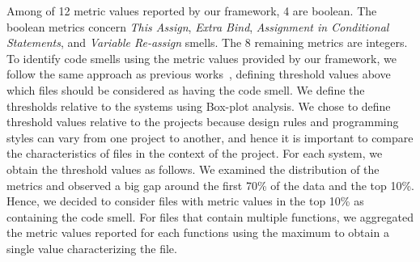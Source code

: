  Among of 12 metric values reported by our framework, 4 are boolean. The boolean metrics concern \emph{This Assign}, \emph{Extra Bind}, \emph{Assignment in Conditional Statements}, and \emph{Variable Re-assign} smells. The 8 remaining metrics are integers. To identify code smells using the metric values provided by our framework, we follow the same approach as previous works~\cite{marinescu2004detection, mazinanian2016migrating}, defining threshold values above which files should be considered as having the code smell. We define the thresholds relative to the systems using Box-plot analysis. We chose to define threshold values relative to the projects because design rules and programming styles can vary from one project to another, and hence it is important to compare the characteristics of files in the context of the project. For each system, we obtain the threshold values as follows. We examined the distribution of the metrics and observed a big gap around the first 70\% of the data and the top 10\%. Hence, we decided to consider files with metric values in the top 10\% as containing the code smell. For files that contain multiple functions, we aggregated the metric values reported for each functions using the maximum to obtain a single value characterizing the file. %

%
%

